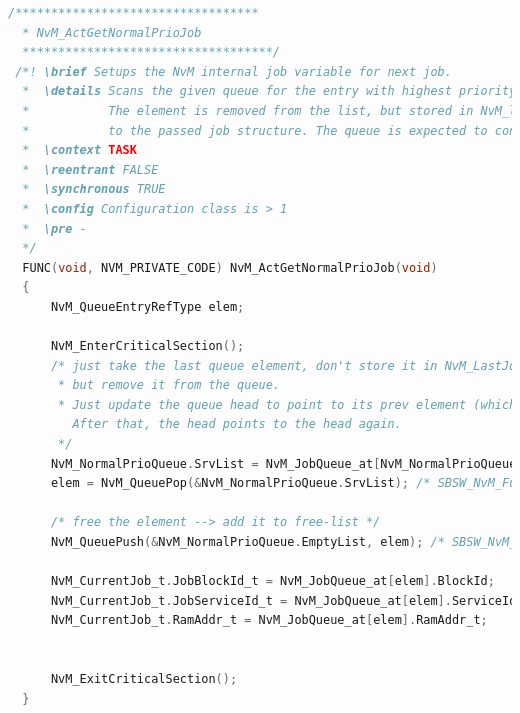 \begin{lstlisting}[language=C,style=C]
  /**********************************
  * NvM_ActGetNormalPrioJob
  ***********************************/
 /*! \brief Setups the NvM internal job variable for next job.
  *  \details Scans the given queue for the entry with highest priority, located nearest to the list end.
  *           The element is removed from the list, but stored in NvM_lastJobEntry. The job parameters will be copied
  *           to the passed job structure. The queue is expected to contain at least one element.
  *  \context TASK
  *  \reentrant FALSE
  *  \synchronous TRUE
  *  \config Configuration class is > 1
  *  \pre -
  */
  FUNC(void, NVM_PRIVATE_CODE) NvM_ActGetNormalPrioJob(void)
  {
      NvM_QueueEntryRefType elem;
  
      NvM_EnterCriticalSection();
      /* just take the last queue element, don't store it in NvM_LastJobEntry (it does not exist),
       * but remove it from the queue.
       * Just update the queue head to point to its prev element (which is the tail), then pop.
         After that, the head points to the head again.
       */
      NvM_NormalPrioQueue.SrvList = NvM_JobQueue_at[NvM_NormalPrioQueue.SrvList].PrevEntry;
      elem = NvM_QueuePop(&NvM_NormalPrioQueue.SrvList); /* SBSW_NvM_FuncCall_PtrParam_Queue */
  
      /* free the element --> add it to free-list */
      NvM_QueuePush(&NvM_NormalPrioQueue.EmptyList, elem); /* SBSW_NvM_FuncCall_PtrParam_Queue */
  
      NvM_CurrentJob_t.JobBlockId_t = NvM_JobQueue_at[elem].BlockId;
      NvM_CurrentJob_t.JobServiceId_t = NvM_JobQueue_at[elem].ServiceId;
      NvM_CurrentJob_t.RamAddr_t = NvM_JobQueue_at[elem].RamAddr_t;
  
  
      NvM_ExitCriticalSection();
  }
\end{lstlisting}